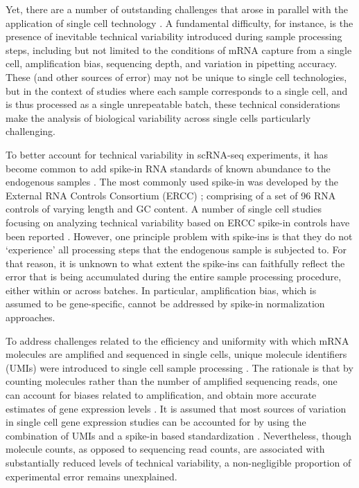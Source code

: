 Yet, there are a number of outstanding challenges that arose in
parallel with the application of single cell technology
\citep{Stegle2015}. A fundamental difficulty, for instance, is the
presence of inevitable technical variability introduced during sample
processing steps, including but not limited to the conditions of mRNA
capture from a single cell, amplification bias, sequencing depth, and
variation in pipetting accuracy. These (and other sources of error)
may not be unique to single cell technologies, but in the context of
studies where each sample corresponds to a single cell, and is thus
processed as a single unrepeatable batch, these technical
considerations make the analysis of biological variability across
single cells particularly challenging.

To better account for technical variability in scRNA-seq experiments,
it has become common to add spike-in RNA standards of known abundance
to the endogenous samples \citep{Brennecke2013, Grun2014}. The most
commonly used spike-in was developed by the External RNA Controls
Consortium (ERCC) \citep{Jiang2011}; comprising of a set of 96 RNA
controls of varying length and GC content. A number of single cell
studies focusing on analyzing technical variability based on ERCC
spike-in controls have been reported \citep{Brennecke2013, Grun2014,
  Ding2015, Vallejos2015}. However, one principle problem with
spike-ins is that they do not `experience' all processing steps that
the endogenous sample is subjected to. For that reason, it is unknown
to what extent the spike-ins can faithfully reflect the error that is
being accumulated during the entire sample processing procedure,
either within or across batches. In particular, amplification bias,
which is assumed to be gene-specific, cannot be addressed by spike-in
normalization approaches.

To address challenges related to the efficiency and uniformity with
which mRNA molecules are amplified and sequenced in single cells,
unique molecule identifiers (UMIs) were introduced to single cell
sample processing \citep{Kivioja2011, Fu2011, Casbon2011,
  Shiroguchi2012}.  The rationale is that by counting molecules rather
than the number of amplified sequencing reads, one can account for
biases related to amplification, and obtain more accurate estimates of
gene expression levels \citep{Jaitin2014, Islam2014, Grun2014}. It is
assumed that most sources of variation in single cell gene expression
studies can be accounted for by using the combination of UMIs and a
spike-in based standardization \citep{Islam2014,
  Vallejos2015}. Nevertheless, though molecule counts, as opposed to
sequencing read counts, are associated with substantially reduced
levels of technical variability, a non-negligible proportion of
experimental error remains unexplained.

